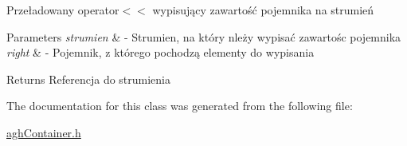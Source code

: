 \-Przeładowany operator$<$$<$ wypisujący zawartość pojemnika na strumień 


\begin{DoxyParams}{\-Parameters}
{\em strumien} & -\/ \-Strumien, na który nleży wypisać zawartośc pojemnika \\
\hline
{\em right} & -\/ \-Pojemnik, z którego pochodzą elementy do wypisania \\
\hline
\end{DoxyParams}
\begin{DoxyReturn}{\-Returns}
\-Referencja do strumienia 
\end{DoxyReturn}


\-The documentation for this class was generated from the following file\-:\begin{DoxyCompactItemize}
\item 
\hyperlink{aghContainer_8h}{agh\-Container.\-h}\end{DoxyCompactItemize}
